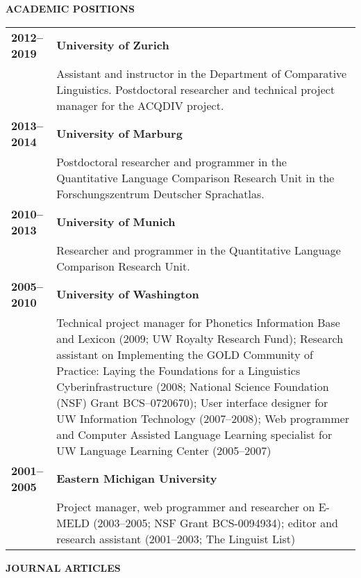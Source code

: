 \documentclass[11pt]{article}
\begin{document}
\vskip 20pt
\begin{flushleft}
{\bf ACADEMIC POSITIONS}
\end{flushleft}
\begin{tabular}{lp{5.5in}}
\bf 2012--2019 & {\bf University of Zurich} \\
& Assistant and instructor in the Department of Comparative Linguistics. Postdoctoral researcher and technical project manager for the ACQDIV project.\\

\bf 2013--2014 & {\bf University of Marburg} \\
& Postdoctoral researcher and programmer in the Quantitative Language Comparison Research Unit in the Forschungszentrum Deutscher Sprachatlas. \\

\bf 2010--2013 & {\bf University of Munich} \\
& Researcher and programmer in the Quantitative Language Comparison Research Unit. \\

\bf 2005--2010 & {\bf University of Washington} \\
& Technical project manager for Phonetics Information Base and Lexicon (2009; UW Royalty Research Fund); Research assistant on Implementing the GOLD Community of Practice: Laying the Foundations for a Linguistics Cyberinfrastructure (2008; National Science Foundation (NSF) Grant BCS--0720670); User interface designer for UW Information Technology (2007--2008); Web programmer and Computer Assisted Language Learning specialist for UW Language Learning Center (2005--2007) \\

\bf 2001--2005 & {\bf Eastern Michigan University} \\ 
& Project manager, web programmer and researcher on E-MELD (2003--2005; NSF Grant BCS-0094934); editor and research assistant (2001--2003; The Linguist List)\\
\end{tabular}

\newpage
\vskip 20pt
\begin{flushleft}
{\bf JOURNAL ARTICLES}
\end{flushleft}
\end{document}
